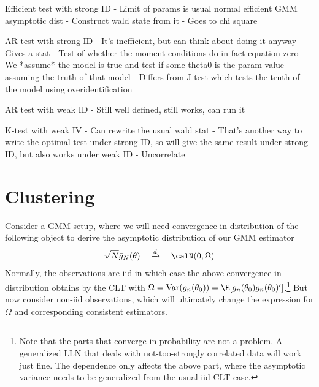 \documentclass[12pt]{article}
\theoremstyle{plain}
\theoremstyle{definition}
\theoremstyle{remark}
\newcommand{\Var}{\operatorname{Var}}
\newcommand{\dto}{\xrightarrow{d}}
\begin{document}
Efficient test with strong ID
- Limit of params is usual normal efficient GMM asymptotic dist
- Construct wald state from it
- Goes to chi square

AR test with strong ID
- It's inefficient, but can think about doing it anyway
- Gives a stat
- Test of whether the moment conditions do in fact equation zero
- We *assume* the model is true and test if some theta0 is the param
value assuming the truth of that model
- Differs from J test which tests the truth of the model using
overidentification

AR test with weak ID
- Still well defined, still works, can run it

K-test with weak IV
- Can rewrite the usual wald stat
- That's another way to write the optimal test under strong ID, so will
give the same result under strong ID, but also works under weak ID
- Uncorrelate




\clearpage
\section{Clustering}

Consider a GMM setup, where we will need convergence in distribution of
the following object to derive the asymptotic distribution of our GMM
estimator
\begin{align*}
  \sqrt{N}\bar{g}_N(\theta)
  \quad\dto\quad
  \calN(0,\Omega)
\end{align*}
Normally, the observations are iid in which case the above convergence
in distribution obtains by the CLT with
$\Omega=\Var(g_n(\theta_0))=\E[g_n(\theta_0)g_n(\theta_0)']$.\footnote{%
  Note that the parts that converge in probability are not a problem. A
  generalized LLN that deals with not-too-strongly correlated data will
  work just fine. The dependence only affects the above part, where the
  asymptotic variance needs to be generalized from the usual
  iid CLT case.
}
But now consider non-iid observations, which will ultimately change the
expression for $\Omega$ and corresponding consistent estimators.
\end{document}
